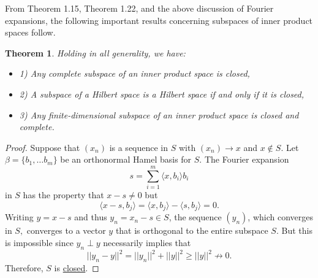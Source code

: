 \documentclass[psamsfonts]{amsart}
\newtheorem{thm}{Theorem}[section]
\theoremstyle{definition}
\theoremstyle{remark}
\numberwithin{equation}{section}
\begin{document}
From Theorem 1.15, Theorem 1.22, and the above discussion of Fourier expansions, the following important results concerning subspaces of inner product spaces follow. 

\begin{thm}
Holding in all generality, we have: 
\begin{itemize}
    \item 1) Any complete subspace of an inner product space is closed, 
    \item 2) A subspace of a Hilbert space is a Hilbert space if and only if it is closed, 
    \item 3) Any finite-dimensional subspace of an inner product space is closed and complete. 
\end{itemize}
\end{thm}

\begin{proof}
Suppose that $(x_n)$ is a sequence in $S$ with $(x_n) \rightarrow x$ and $x \not\in S$. Let $\beta =\{ b_1, \dots b_m \}$ be an orthonormal Hamel basis for $S$. The Fourier expansion 
$$s = \sum _{i = 1} ^m \langle x, b_i \rangle b_i $$
in $S$ has the property that $x-s \neq 0$ but 
$$\langle x - s, b_j \rangle = \langle x , b_j \rangle - \langle s, b_j \rangle = 0. $$
Writing $y = x - s$ and thus $y_n = x_n -s \in S$, the sequence $(y_n)$, which converges in $S,$ converges to a vector $y$ that is orthogonal to the entire subspace $S$. But this is impossible since $y_n \perp y$ necessarily implies that 
$$||y_n - y|| ^2 = ||y_n||^2 + ||y||^2 \geq ||y||^2 \not \rightarrow 0.  $$
Therefore, $S$ is \href{https://math.stackexchange.com/questions/1081742/what-is-the-definition-of-closed-subspace}{closed}. 
\end{proof}
\end{document}
